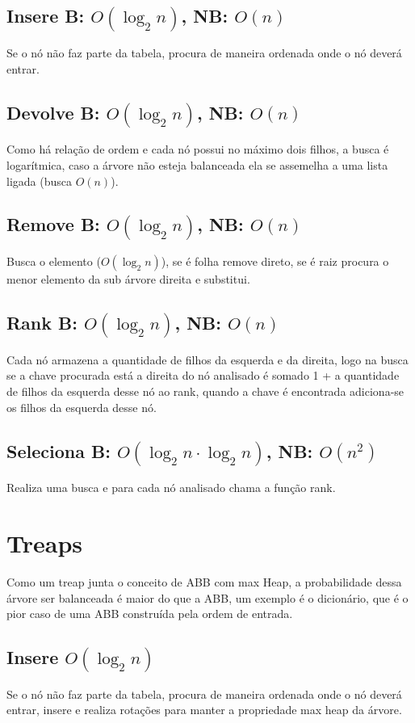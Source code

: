 \documentclass[14pt]{article}
\begin{document}
{\subsection{Insere B: $O(\log_{2}n)$, NB: $O(n)$ } 
Se o nó não faz parte da tabela, procura de maneira ordenada onde o nó deverá entrar.
\subsection{Devolve B: $O(\log_{2}n)$, NB: $O(n)$} 
Como há relação de ordem e cada nó possui no máximo dois filhos, a busca é logarítmica, caso a árvore
não esteja balanceada ela se assemelha a uma lista ligada (busca $O(n)$).
\subsection{Remove B: $O(\log_{2}n)$, NB: $O(n)$}
Busca o elemento ($O(\log_{2}n)$), se é folha remove direto, se é raiz procura o menor elemento da 
sub árvore direita e substitui.
\subsection{Rank B: $O(\log_{2}n)$, NB: $O(n)$}
Cada nó armazena a quantidade de filhos da esquerda e da direita, logo na busca se a chave procurada
está a direita do nó analisado é somado 1 + a quantidade de filhos da esquerda desse nó ao rank, quando a chave 
é encontrada adiciona-se os filhos da esquerda desse nó.
\subsection{Seleciona B: $O(\log_{2}n \cdot \log_{2}n )$, NB: $O(n^2)$}
Realiza uma busca e para cada nó analisado chama a função rank.
\\

\section{Treaps}
Como um treap junta o conceito de ABB com max Heap, a probabilidade dessa árvore ser balanceada
é maior do que a ABB, um exemplo é o dicionário, que é o pior caso de uma ABB construída pela ordem
de entrada.

\subsection{Insere $O(\log_{2}n)$} 
Se o nó não faz parte da tabela, procura de maneira ordenada onde o nó deverá entrar, insere e realiza 
rotações para manter a propriedade max heap da árvore.
}
\end{document}
